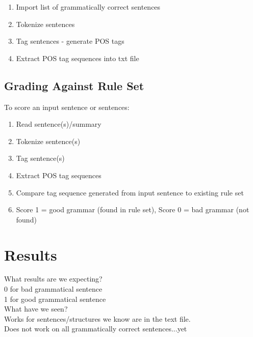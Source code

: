 \documentclass[11pt,a4paper]{article}
\begin{document}
\begin{multicols}{2}
\begin{enumerate}
   \item Import list of grammatically correct sentences
   \item Tokenize sentences
   \item Tag sentences - generate POS tags
   \item Extract POS tag sequences into txt file
  \end{enumerate}

\subsection{Grading Against Rule Set}
 To score an input sentence or sentences:
 
\begin{enumerate}
   \item Read sentence(s)/summary
   \item Tokenize sentence(s)
   \item Tag sentence(s) 
   \item Extract POS tag sequences
   \item Compare tag sequence generated from input sentence to existing rule set
   \item Score 1 = good grammar (found in rule set), Score 0 = bad grammar (not found)
  \end{enumerate}

\section{Results}
What results are we expecting?\\
0 for bad grammatical sentence\\
1 for good grammatical sentence\\

What have we seen?\\
Works for sentences/structures we know are in the text file.\\
Does not work on all grammatically correct sentences...yet\\




\end{multicols}
\end{document}
